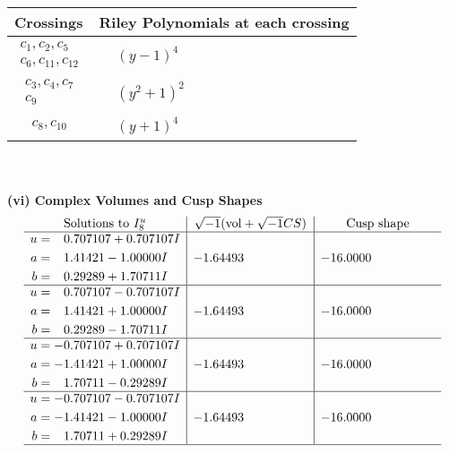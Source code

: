 \documentclass[1p]{elsarticle_modified}
\theoremstyle{definition}
\newcommand{\I}{\sqrt{-1}}
\begin{document}
\begin{tabular}{m{50pt}|m{274pt}}
Crossings & \hspace{64pt}Riley Polynomials at each crossing \\
\hline $$\begin{aligned}c_{1},c_{2},c_{5}\\c_{6},c_{11},c_{12}\end{aligned}$$&$\begin{aligned}
&(y-1)^4
\end{aligned}$\\
\hline $$\begin{aligned}c_{3},c_{4},c_{7}\\c_{9}\end{aligned}$$&$\begin{aligned}
&(y^2+1)^2
\end{aligned}$\\
\hline $$\begin{aligned}c_{8},c_{10}\end{aligned}$$&$\begin{aligned}
&(y+1)^4
\end{aligned}$\\
\hline
\end{tabular}\\~\\
\newpage\flushleft \textbf{(vi) Complex Volumes and Cusp Shapes}
$$\begin{array}{c|c|c}  
\text{Solutions to }I^u_{8}& \I (\text{vol} + \sqrt{-1}CS) & \text{Cusp shape}\\
 \hline 
\begin{aligned}
u &= \phantom{-}0.707107 + 0.707107 I \\
a &= \phantom{-}1.41421 - 1.00000 I \\
b &= \phantom{-}0.29289 + 1.70711 I\end{aligned}
 & -1.64493\phantom{ +0.000000I} & -16.0000\phantom{ +0.000000I} \\ \hline\begin{aligned}
u &= \phantom{-}0.707107 - 0.707107 I \\
a &= \phantom{-}1.41421 + 1.00000 I \\
b &= \phantom{-}0.29289 - 1.70711 I\end{aligned}
 & -1.64493\phantom{ +0.000000I} & -16.0000\phantom{ +0.000000I} \\ \hline\begin{aligned}
u &= -0.707107 + 0.707107 I \\
a &= -1.41421 + 1.00000 I \\
b &= \phantom{-}1.70711 - 0.29289 I\end{aligned}
 & -1.64493\phantom{ +0.000000I} & -16.0000\phantom{ +0.000000I} \\ \hline\begin{aligned}
u &= -0.707107 - 0.707107 I \\
a &= -1.41421 - 1.00000 I \\
b &= \phantom{-}1.70711 + 0.29289 I\end{aligned}
 & -1.64493\phantom{ +0.000000I} & -16.0000\phantom{ +0.000000I}\\
 \hline 
 \end{array}$$\newpage\newpage\renewcommand{\arraystretch}{1}
\end{document}
